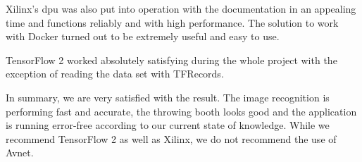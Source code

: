 Xilinx's \acrshort{dpu} was also put into operation with the documentation in an appealing time and functions reliably and with high performance.
The solution to work with Docker turned out to be extremely useful and easy to use.

TensorFlow 2 worked absolutely satisfying during the whole project with the exception of reading the data set with TFRecords. 

In summary, we are very satisfied with the result. 
The image recognition is performing fast and accurate, the throwing booth looks good and the application is running error-free according to our current state of knowledge.
While we recommend TensorFlow 2 as well as Xilinx, we do not recommend the use of Avnet.
